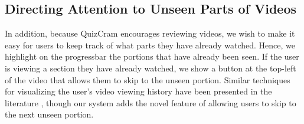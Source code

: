 \documentclass{chi-ext}
\begin{document}


\subsection{Directing Attention to Unseen Parts of Videos}

In addition, because QuizCram encourages reviewing videos, we wish to make it easy for users to keep track of what parts they have already watched. Hence, we highlight on the progressbar the portions that have already been seen. If the user is viewing a section they have already watched, we show a button at the top-left of the video that allows them to skip to the unseen portion. Similar techniques for visualizing the user's video viewing history have been presented in the literature \cite{socialnavigation} \cite{lecturescape}, though our system adds the novel feature of allowing users to skip to the next unseen portion.

\end{document}
